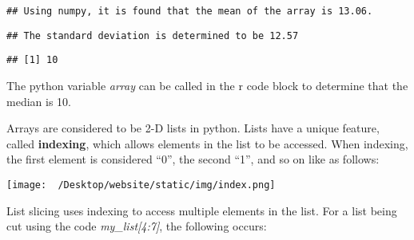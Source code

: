 \documentclass[]{article}
\newenvironment{Shaded}{\begin{snugshade}}{\end{snugshade}}
\newcommand{\BuiltInTok}[1]{#1}
\newcommand{\KeywordTok}[1]{\textcolor[rgb]{0.13,0.29,0.53}{\textbf{#1}}}
\newcommand{\NormalTok}[1]{#1}
\newcommand{\OperatorTok}[1]{\textcolor[rgb]{0.81,0.36,0.00}{\textbf{#1}}}
\newcommand{\SpecialCharTok}[1]{\textcolor[rgb]{0.00,0.00,0.00}{#1}}
\newcommand{\StringTok}[1]{\textcolor[rgb]{0.31,0.60,0.02}{#1}}
\begin{document}
\begin{Shaded}
\end{Shaded}

\begin{verbatim}
## Using numpy, it is found that the mean of the array is 13.06.
\end{verbatim}

\begin{Shaded}
\end{Shaded}

\begin{verbatim}
## The standard deviation is determined to be 12.57
\end{verbatim}

\begin{Shaded}
\end{Shaded}

\begin{verbatim}
## [1] 10
\end{verbatim}

The python variable \emph{array} can be called in the r code block to
determine that the median is 10.

Arrays are considered to be 2-D lists in python. Lists have a unique
feature, called \textbf{indexing}, which allows elements in the list to
be accessed. When indexing, the first element is considered ``0'', the
second ``1'', and so on like as follows:

\texttt{[image: ~/Desktop/website/static/img/index.png]}

List slicing uses indexing to access multiple elements in the list. For
a list being cut using the code \emph{my\_list{[}4:7{]}}, the following
occurs:
\end{document}
